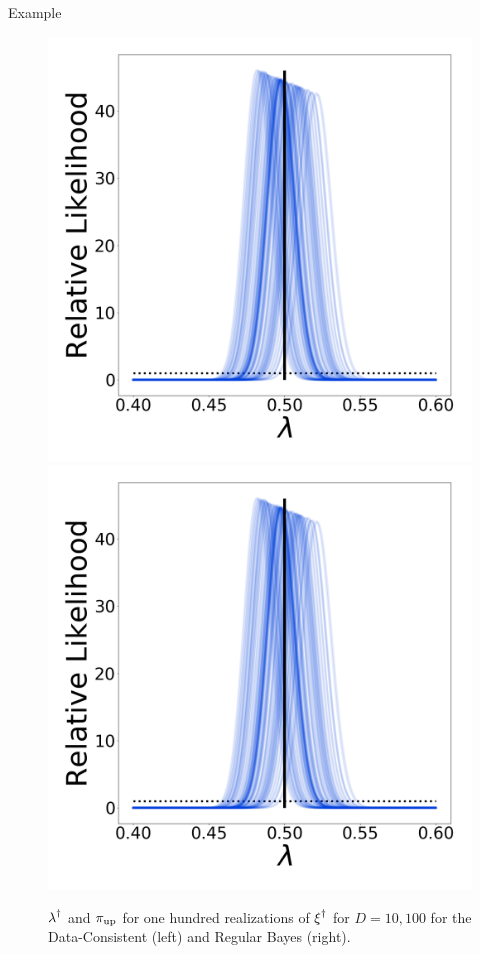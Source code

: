 \begin{block}{Example}
\begin{figure}
        \includegraphics[width=13cm]{figures/posterior_stability_D100_sigma-10E-4}
        \includegraphics[width=13cm]{figures/posterior_stability_D100_sigma-10E-4}
        \vspace{-1cm}
        \caption{$\operatorname*{\lambda}^\dagger$ and $\operatorname*{\pi_{up}}$ for one hundred realizations of $\operatorname*{\xi}^\dagger$ for $D=10,100$ for the Data-Consistent (left) and Regular Bayes (right).}
    \end{figure}

\end{block}
